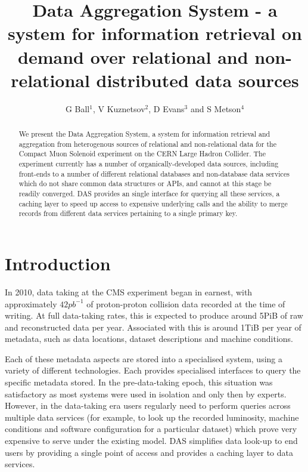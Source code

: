 \documentclass[a4paper]{jpconf}
\begin{document}
\title{Data Aggregation System - a system for information retrieval on demand over relational and non-relational distributed data sources}
\author{G Ball$^1$, V Kuznetsov$^2$, D Evans$^3$ and S Metson$^4$}

\address{$^1$ Imperial College London, London, UK}
\address{$^2$ Cornell University, Ithaca, New York, USA}
\address{$^3$ Fermilab, Batavia, Illinois, USA}
\address{$^4$ Bristol University, Bristol, UK}


\begin{abstract}
We present the Data Aggregation System, a system for information retrieval and aggregation from heterogenous sources of relational and non-relational data for the Compact Muon Solenoid experiment on the CERN Large Hadron Collider. The experiment currently has a number of organically-developed data sources, including front-ends to a number of different relational databases and non-database data services which do not share common data structures or APIs, and cannot at this stage be readily converged. DAS provides an single interface for querying all these services, a caching layer to speed up access to expensive underlying calls and the ability to merge records from different data services pertaining to a single primary key.
\end{abstract}

\section{Introduction}

In 2010, data taking at the CMS experiment began in earnest, with approximately $42pb^{-1}$ of proton-proton collision data recorded at the time of writing. At full data-taking rates, this is expected to produce around 5PiB of raw and reconstructed data per year. Associated with this is around 1TiB per year of metadata, such as data locations, dataset descriptions and machine conditions.

Each of these metadata aspects are stored into a specialised system, using a variety of different technologies. Each provides specialised interfaces to query the specific metadata stored. In the pre-data-taking epoch, this situation was satisfactory as most systems were used in isolation and only then by experts. However, in the data-taking era users regularly need to perform queries across multiple data services (for example, to look up the recorded luminosity, machine conditions and software configuration for a particular dataset) which prove very expensive to serve under the existing model. DAS simplifies data look-up to end users by providing a single point of access and provides a caching layer to data services.
\end{document}
